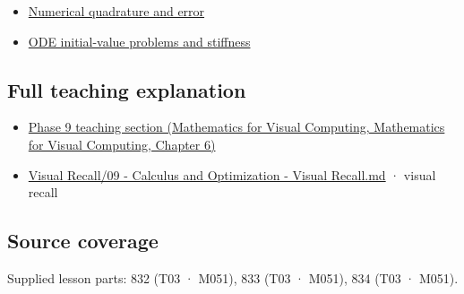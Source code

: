 \begin{itemize}
\tightlist
\item
  \hyperref[appendix-80521eae6b71]{Numerical quadrature and error}
\item
  \hyperref[appendix-e8ab9836882e]{ODE initial-value problems and stiffness}
\end{itemize}

\subsection{Full teaching explanation}\label{appendix-1a50e72435c2-full-teaching-explanation}

\begin{itemize}
\tightlist
\item
  \href{../02-Mathematics-for-Visual-Computing/main.pdf\#nameddest=02-foundations-ii-ch022-integration-and-quadrature}{Phase 9 teaching section (Mathematics for Visual Computing, Mathematics for Visual Computing, Chapter 6)}
\item
  \hyperref[appendix-adf48f5dc5c1]{Visual Recall/09 - Calculus and Optimization - Visual Recall.md} · visual recall
\end{itemize}

\subsection{Source coverage}\label{appendix-1a50e72435c2-source-coverage}

Supplied lesson parts: 832 (T03 · M051), 833 (T03 · M051), 834 (T03 · M051).
